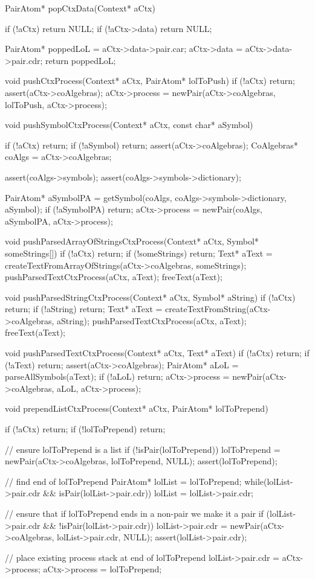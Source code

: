 PairAtom* popCtxData(Context* aCtx) {
  if (!aCtx) return NULL;
  if (!aCtx->data) return NULL;

  PairAtom* poppedLoL = aCtx->data->pair.car;
  aCtx->data          = aCtx->data->pair.cdr;
  return poppedLoL;
}

void pushCtxProcess(Context* aCtx, PairAtom* lolToPush) {
  if (!aCtx) return;
  assert(aCtx->coAlgebras);
  aCtx->process = newPair(aCtx->coAlgebras, lolToPush, aCtx->process);
}

void pushSymbolCtxProcess(Context* aCtx, const char* aSymbol) {
  if (!aCtx) return;
  if (!aSymbol) return;
  assert(aCtx->coAlgebras);
  CoAlgebras* coAlgs = aCtx->coAlgebras;

  assert(coAlgs->symbols);
  assert(coAlgs->symbols->dictionary);

  PairAtom* aSymbolPA =
    getSymbol(coAlgs, coAlgs->symbols->dictionary, aSymbol);
  if (!aSymbolPA) return;
  aCtx->process = newPair(coAlgs, aSymbolPA, aCtx->process);
}

void pushParsedArrayOfStringsCtxProcess(Context* aCtx, Symbol* someStrings[]) {
  if (!aCtx) return;
  if (!someStrings) return;
  Text* aText = createTextFromArrayOfStrings(aCtx->coAlgebras, someStrings);
  pushParsedTextCtxProcess(aCtx, aText);
  freeText(aText);
}

void pushParsedStringCtxProcess(Context* aCtx, Symbol* aString) {
  if (!aCtx) return;
  if (!aString) return;
  Text* aText = createTextFromString(aCtx->coAlgebras, aString);
  pushParsedTextCtxProcess(aCtx, aText);
  freeText(aText);
}

void pushParsedTextCtxProcess(Context* aCtx, Text* aText) {
  if (!aCtx) return;
  if (!aText) return;
  assert(aCtx->coAlgebras);
  PairAtom* aLoL = parseAllSymbols(aText);
  if (!aLoL) return;
  aCtx->process = newPair(aCtx->coAlgebras, aLoL, aCtx->process);
}

void prependListCtxProcess(Context* aCtx, PairAtom* lolToPrepend) {
  if (!aCtx) return;
  if (!lolToPrepend) return;

  // ensure lolToPrepend is a list
  if (!isPair(lolToPrepend)) {
    lolToPrepend = newPair(aCtx->coAlgebras, lolToPrepend, NULL);
    assert(lolToPrepend);
  }

  // find end of lolToPrepend
  PairAtom* lolList = lolToPrepend;
  while(lolList->pair.cdr && isPair(lolList->pair.cdr)) {
    lolList = lolList->pair.cdr;
  }

  // ensure that if lolToPrepend ends in a non-pair we make it a pair
  if (lolList->pair.cdr && !isPair(lolList->pair.cdr)) {
    lolList->pair.cdr = newPair(aCtx->coAlgebras, lolList->pair.cdr, NULL);
    assert(lolList->pair.cdr);
  }

  // place existing process stack at end of lolToPrepend
  lolList->pair.cdr  = aCtx->process;
  aCtx->process = lolToPrepend;
}

